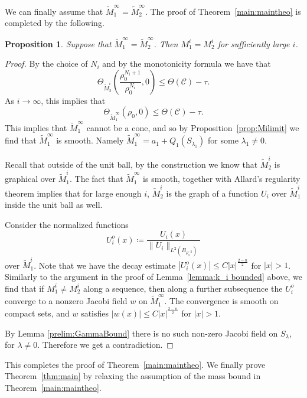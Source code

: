 \documentclass[12pt, reqno ]{amsart}
\newtheorem{prop}[theorem]{Proposition}
\numberwithin{equation}{section}
\begin{document}
We can finally assume that $\widetilde M_1^\infty=\widetilde M_2^{\infty }$. The proof of Theorem~\ref{main:maintheo} is completed by the following. 
\begin{prop}\label{prop:same limit}
    Suppose that $\widetilde M_1^\infty = \widetilde M_2^\infty$. Then $M^i_1=M^i_2$ for sufficiently large $i$. 
\end{prop}
\begin{proof}
By the choice of $N_i$ and by the monotonicity formula we have that
$$ \Theta_{\widetilde M_2^i}\left(\frac{\rho_0^{N_i+1}}{\rho_0^{N_i}}, 0\right) \leq \Theta(\mathcal C)-\tau .$$
As $i\rightarrow \infty$, this implies that
$$\Theta_{\widetilde M_1^\infty} (\rho_0, 0) \leq \Theta(\mathcal C)-\tau. $$
This implies that $\widetilde M^\infty_1$ cannot be a cone, and so by Proposition~\ref{prop:Milimit} we find that $\widetilde M^\infty_1$ is smooth. Namely $\widetilde M^\infty_1 = a_1 + Q_1(S_{\lambda_1})$ for some $\lambda_1\not=0$. 

Recall that outside of the unit ball, by the construction we know that $\widetilde M^i_2$ is graphical over $\widetilde M^i_1$. The fact that $\widetilde M^\infty_1$ is smooth, together with Allard's regularity theorem implies that for large enough $i$, $\widetilde{M}^i_2$ is the graph of a function $U_i$ over $\widetilde{M}^i_1$ inside the unit ball as well. 

Consider the normalized functions
\[ U_i^o(x)\coloneqq  \frac{U_i (x)}{\|U_i \|_{L^2(B_{\rho_0^{-2}})}}\]
over $\widetilde{M}^i_1$. Note that we have the decay estimate $|U_i^o(x)| \leq C|x|^{\frac{2-n}{2}}$ for $|x| > 1$. Similarly to the argument in the proof of Lemma~\ref{lemma:k_i bounded} above, we find that if $M^i_1\not= M^i_2$ along a sequence, then along a further subsequence the $U_i^o$ converge to a nonzero Jacobi field $w$ on $\widetilde M^\infty_1$. The convergence is smooth on compact sets, and $w$ satisfies $|w(x)|\leq C|x|^{\frac{2-n}{2}}$ for $|x| > 1$. 

By Lemma \ref{prelim:GammaBound} there is no such non-zero Jacobi field on $S_\lambda$, for $\lambda\not=0$. Therefore we get a contradiction. 
\end{proof}

This completes the proof of Theorem~\ref{main:maintheo}.
We finally prove Theorem~\ref{thm:main} by relaxing the assumption of the mass bound in Theorem~\ref{main:maintheo}. 
\end{document}
